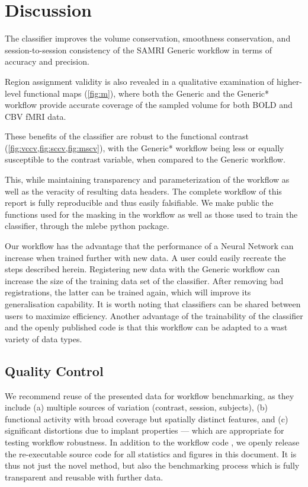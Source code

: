 \section{Discussion}

The classifier improves the volume conservation, smoothness conservation, and session-to-session consistency of the SAMRI Generic workflow in terms of accuracy and precision.

Region assignment validity is also revealed in a qualitative examination of higher-level functional maps (\cref{fig:m}), where both the Generic and the Generic* workflow provide accurate coverage of the sampled volume for both BOLD and CBV fMRI data.

These benefits of the classifier are robust to the functional contrast (\cref{fig:vccv,fig:sccv,fig:mscv}), with the Generic* workflow being less or equally susceptible to the contrast variable, when compared to the Generic workflow.

This, while maintaining transparency and parameterization of the workflow as well as the veracity of resulting data headers.
The complete workflow of this report is fully reproducible and thus easily falsifiable.
We make public the functions used for the masking in the workflow as well as those used to train the classifier, through the mlebe python package.

Our workflow has the advantage that the performance of a Neural Network can increase when trained further with new data.
A user could easily recreate the steps described herein.
Registering new data with the Generic workflow can increase the size of the training data set of the classifier.
After removing bad registrations, the latter can be trained again, which will improve its generalisation capability.
It is worth noting that classifiers can be shared between users to maximize efficiency.
Another advantage of the trainability of the classifier and the openly published code is that this workflow can be adapted to a wast variety of data types.

\subsection{Quality Control}

We recommend reuse of the presented data for workflow benchmarking, as they include (a) multiple sources of variation (contrast, session, subjects), (b) functional activity with broad coverage but spatially distinct features, and (c) significant distortions due to implant properties --- which are appropriate for testing workflow robustness.
In addition to the workflow code \cite{samri}, we openly release the re-executable source code \cite{source} for all statistics and figures in this document.
It is thus not just the novel method, but also the benchmarking process which is fully transparent and reusable with further data.

